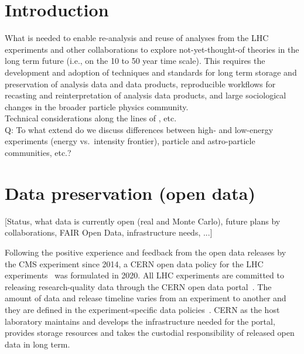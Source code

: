\documentclass[11pt]{article}
\begin{document}
\clearpage

\section{Introduction}

What is needed to enable re-analysis and reuse of analyses from the LHC experiments and other collaborations to explore not-yet-thought-of theories in the long term future (i.e., on the 10 to 50 year time scale).
This requires the development and adoption of techniques and standards for long term storage and preservation of analysis data and data products, reproducible workflows for recasting and reinterpretation of analysis data products, and large sociological changes in the broader particle physics community.\\
Technical considerations along the lines of \cite{LHCReinterpretationForum:2020xtr,Cranmer:2021urp}, etc. \\

Q: To what extend do we discuss differences between high- and low-energy experiments (energy vs.\ intensity frontier), particle and astro-particle communities, etc.? 


\section{Data preservation (open data)}

[Status, what data is currently open (real and Monte Carlo), future plans by collaborations, FAIR Open Data, infrastructure needs, ...]



Following the positive experience and feedback from the open data releases by the CMS experiment since 2014, a CERN open data policy for the LHC experiments~\cite{cern-data-policy} was formulated in 2020. All LHC experiments are committed to releasing research-quality data through the CERN open data portal~\cite{CODP}. The amount of data and release timeline varies from an experiment to another and they are defined in the experiment-specific data policies~\cite{cern-data-policy,cern-open-data-privacy-policy,cms-open-data-policy,atlas-open-data-policy,lhcb-open-data-policy,alice-open-data-policy}. CERN as the host laboratory maintains and develops the infrastructure needed for the portal, provides storage resources and takes the custodial responsibility of released open data in long term. 
\end{document}
